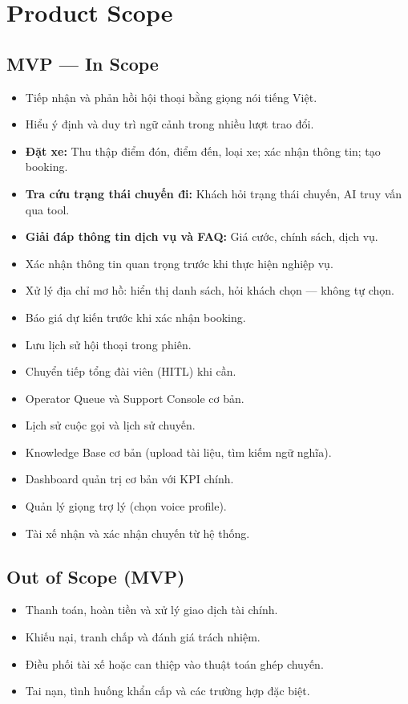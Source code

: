 \documentclass[12pt,a4paper]{article}
\begin{document}
\section{Product Scope}

\subsection{MVP --- In Scope}
\begin{itemize}
  \item Tiếp nhận và phản hồi hội thoại bằng giọng nói tiếng Việt.
  \item Hiểu ý định và duy trì ngữ cảnh trong nhiều lượt trao đổi.
  \item \textbf{Đặt xe:} Thu thập điểm đón, điểm đến, loại xe; xác nhận thông tin; tạo booking.
  \item \textbf{Tra cứu trạng thái chuyến đi:} Khách hỏi trạng thái chuyến, AI truy vấn qua tool.
  \item \textbf{Giải đáp thông tin dịch vụ và FAQ:} Giá cước, chính sách, dịch vụ.
  \item Xác nhận thông tin quan trọng trước khi thực hiện nghiệp vụ.
  \item Xử lý địa chỉ mơ hồ: hiển thị danh sách, hỏi khách chọn --- không tự chọn.
  \item Báo giá dự kiến trước khi xác nhận booking.
  \item Lưu lịch sử hội thoại trong phiên.
  \item Chuyển tiếp tổng đài viên (HITL) khi cần.
  \item Operator Queue và Support Console cơ bản.
  \item Lịch sử cuộc gọi và lịch sử chuyến.
  \item Knowledge Base cơ bản (upload tài liệu, tìm kiếm ngữ nghĩa).
  \item Dashboard quản trị cơ bản với KPI chính.
  \item Quản lý giọng trợ lý (chọn voice profile).
  \item Tài xế nhận và xác nhận chuyến từ hệ thống.
\end{itemize}

\subsection{Out of Scope (MVP)}
\begin{itemize}
  \item Thanh toán, hoàn tiền và xử lý giao dịch tài chính.
  \item Khiếu nại, tranh chấp và đánh giá trách nhiệm.
  \item Điều phối tài xế hoặc can thiệp vào thuật toán ghép chuyến.
  \item Tai nạn, tình huống khẩn cấp và các trường hợp đặc biệt.
\end{itemize}
\end{document}
